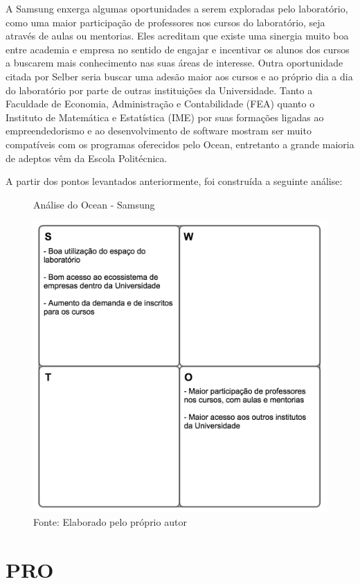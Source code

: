 A Samsung enxerga algumas oportunidades a serem exploradas pelo laboratório, como uma maior participação de professores nos cursos do laboratório, seja através de aulas ou mentorias. Eles acreditam que existe uma sinergia muito boa entre academia e empresa no sentido de engajar e incentivar os alunos dos cursos a buscarem mais conhecimento nas suas áreas de interesse. Outra oportunidade citada por Selber seria buscar uma adesão maior aos cursos e ao próprio dia a dia do laboratório por parte de outras instituições da Universidade. Tanto a Faculdade de Economia, Administração e Contabilidade (FEA) quanto o Instituto de Matemática e Estatística (IME) por suas formações ligadas ao empreendedorismo e ao desenvolvimento de software mostram ser muito compatíveis com os programas oferecidos pelo Ocean, entretanto a grande maioria de adeptos vêm da Escola Politécnica.

A partir dos pontos levantados anteriormente, foi construída a seguinte análise:

\begin{figure}[H]
\caption{Análise do Ocean - Samsung}
\centerline{\includegraphics[scale=0.75]{img/samsungswot}}
\label{fig:swotsamsung}
\caption* {Fonte: Elaborado pelo próprio autor}
\end{figure}

\section{PRO}

